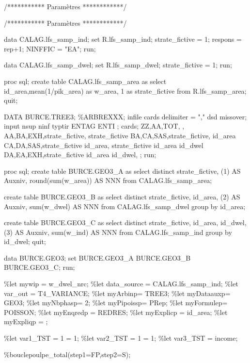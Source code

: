 \documentclass[
]{article}
\newenvironment{Shaded}{\begin{snugshade}}{\end{snugshade}}
\newcommand{\NormalTok}[1]{#1}
\begin{document}
\begin{Shaded}
\begin{Highlighting}[]
\NormalTok{/*********** Paramètres ************/}

\NormalTok{/*********** Paramètres ************/}

\NormalTok{data CALAG.lfs\_samp\_ind; set R.lfs\_samp\_ind;}
\NormalTok{strate\_fictive = 1;}
\NormalTok{respons = rep+1;}
\NormalTok{NINFFIC = "EA";}
\NormalTok{run;}

\NormalTok{data CALAG.lfs\_samp\_dwel; set R.lfs\_samp\_dwel;  }
\NormalTok{strate\_fictive = 1;}
\NormalTok{run;}

\NormalTok{proc sql; create table CALAG.lfs\_samp\_area as select}
\NormalTok{id\_area,mean(1/pik\_area) as w\_area,}
\NormalTok{1 as strate\_fictive}
\NormalTok{from R.lfs\_samp\_area;}
\NormalTok{quit;}

\NormalTok{DATA BURCE.TREE3;   }
\NormalTok{\%ARBREXXX;}
\NormalTok{infile cards delimiter = "," dsd missover;}
\NormalTok{input nsup ninf typtir ENTAG ENTI ;}
\NormalTok{cards;   }
\NormalTok{ZZ,AA,TOT, ,   }
\NormalTok{AA,BA,EXH,strate\_fictive, strate\_fictive}
\NormalTok{BA,CA,SAS,strate\_fictive, id\_area}
\NormalTok{CA,DA,SAS,strate\_fictive id\_area, strate\_fictive id\_area id\_dwel}
\NormalTok{DA,EA,EXH,strate\_fictive id\_area id\_dwel, }
\NormalTok{;}
\NormalTok{run;}

\NormalTok{proc sql;}
\NormalTok{create table BURCE.GEO3\_A as select distinct}
\NormalTok{    strate\_fictive, (1) AS Auxniv, round(sum(w\_area)) AS NNN}
\NormalTok{from CALAG.lfs\_samp\_area;}

\NormalTok{create table BURCE.GEO3\_B as select distinct}
\NormalTok{    strate\_fictive, id\_area, (2) AS Auxniv, sum(w\_dwel) AS NNN}
\NormalTok{from CALAG.lfs\_samp\_dwel group by id\_area;}

\NormalTok{create table BURCE.GEO3\_C as select distinct}
\NormalTok{    strate\_fictive, id\_area, id\_dwel, (3) AS Auxniv, sum(w\_ind) AS NNN}
\NormalTok{from CALAG.lfs\_samp\_ind group by id\_dwel;}
\NormalTok{quit;}

\NormalTok{data BURCE.GEO3; set BURCE.GEO3\_A BURCE.GEO3\_B BURCE.GEO3\_C; run;}

\NormalTok{\%let mywip = w\_dwel\_nrc;}
\NormalTok{\%let data\_source = CALAG.lfs\_samp\_ind;}
\NormalTok{\%let var\_out = T4\_VARIANCE;}
\NormalTok{\%let myArbinp=  TREE3;}
\NormalTok{\%let myDataauxp= GEO3;}
\NormalTok{\%let myNbphasp=  2;}
\NormalTok{\%let myPipoissp= PRep;}
\NormalTok{\%let myFormulep= POISSON;}
\NormalTok{\%let myEnqredp = REDRES;}
\NormalTok{\%let myExplicp = id\_area;}
\NormalTok{\%let myExpliqp = ;}

\NormalTok{\%let var1\_TST = 1 = 1;}
\NormalTok{\%let var2\_TST = 1 = 1;}
\NormalTok{\%let var3\_TST = income;}

\NormalTok{\%bouclepoulpe\_total(step1=FP,step2=S);}
\end{Highlighting}
\end{Shaded}
\end{document}
